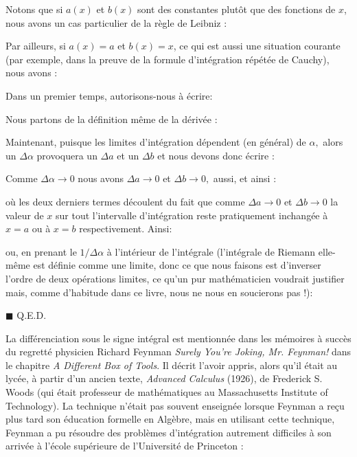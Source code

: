 	Notons que si $a(x)$ et $b(x)$ sont des constantes plutôt que des fonctions de $x$, nous avons un cas particulier de la règle de Leibniz :
	
	Par ailleurs, si $a(x)=a$ et $b(x)=x$, ce qui est aussi une situation courante (par exemple, dans la preuve de la formule d'intégration répétée de Cauchy), nous avons :
	
	\begin{dem}
	Dans un premier temps, autorisons-nous à écrire:
	
	Nous partons de la définition même de la dérivée :
	
	Maintenant, puisque les limites d'intégration dépendent (en général) de $\alpha,$ alors un $\Delta \alpha$ provoquera un $\Delta a$ et un $\Delta b$ et nous devons donc écrire :
	
	Comme $\Delta \alpha \rightarrow 0$ nous avons $\Delta a \rightarrow 0$ et $\Delta b \rightarrow 0,$ aussi, et ainsi :
	
	où les deux derniers termes découlent du fait que comme $\Delta a \rightarrow 0$ et $\Delta b \rightarrow 0$ la valeur de $x$ sur tout l'intervalle d'intégration reste pratiquement inchangée à $x=a$ ou à $x= b$ respectivement. Ainsi:
	
	ou, en prenant le $1/\Delta \alpha$ à l'intérieur de l'intégrale (l'intégrale de Riemann elle-même est définie comme une limite, donc ce que nous faisons est d'inverser l'ordre de deux opérations limites, ce qu'un pur mathématicien voudrait justifier mais, comme d'habitude dans ce livre, nous ne nous en soucierons pas !):
	
	\begin{flushright}
		$\blacksquare$  Q.E.D.
	\end{flushright}
	\end{dem}
	La différenciation sous le signe intégral est mentionnée dans les mémoires à succès du regretté physicien Richard Feynman \textit{Surely You're Joking, Mr. Feynman!} dans le chapitre \textit{A Different Box of Tools}. Il décrit l'avoir appris, alors qu'il était au lycée, à partir d'un ancien texte, \textit{Advanced Calculus} (1926), de Frederick S. Woods (qui était professeur de mathématiques au Massachusetts Institute of Technology). La technique n'était pas souvent enseignée lorsque Feynman a reçu plus tard son éducation formelle en Algèbre, mais en utilisant cette technique, Feynman a pu résoudre des problèmes d'intégration autrement difficiles à son arrivée à l'école supérieure de l'Université de Princeton :
	
